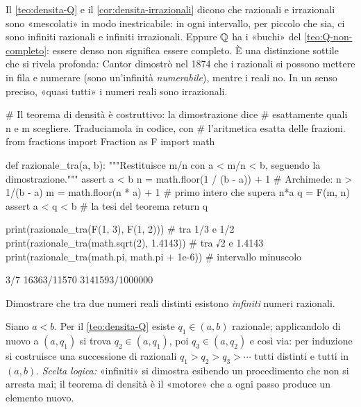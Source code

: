 \begin{osservazione}
Il \cref{teo:densita-Q} e il \cref{cor:densita-irrazionali} dicono che razionali e
irrazionali sono «mescolati» in modo inestricabile: in ogni intervallo, per piccolo che
sia, ci sono infiniti razionali e infiniti irrazionali. Eppure $\mathbb{Q}$ ha i «buchi» del
\cref{teo:Q-non-completo}: essere denso non significa essere completo. È una distinzione
sottile che si rivela profonda: Cantor dimostrò nel 1874 che i razionali si possono
mettere in fila e numerare (sono un'infinità \emph{numerabile}), mentre i reali no. In
un senso preciso, «quasi tutti» i numeri reali sono irrazionali.
\end{osservazione}

\begin{python}
# Il teorema di densità è costruttivo: la dimostrazione dice
# esattamente quali n e m scegliere. Traduciamola in codice, con
# l'aritmetica esatta delle frazioni.
from fractions import Fraction as F
import math

def razionale_tra(a, b):
    """Restituisce m/n con a < m/n < b, seguendo la dimostrazione."""
    assert a < b
    n = math.floor(1 / (b - a)) + 1     # Archimede: n > 1/(b - a)
    m = math.floor(n * a) + 1           # primo intero che supera n*a
    q = F(m, n)
    assert a < q < b                    # la tesi del teorema
    return q

print(razionale_tra(F(1, 3), F(1, 2)))         # tra 1/3 e 1/2
print(razionale_tra(math.sqrt(2), 1.4143))     # tra √2 e 1.4143
print(razionale_tra(math.pi, math.pi + 1e-6))  # intervallo minuscolo
\end{python}
\begin{risultato}
3/7
16363/11570
3141593/1000000
\end{risultato}

\begin{esercizio}
Dimostrare che tra due numeri reali distinti esistono \emph{infiniti} numeri razionali.
\begin{soluzione}
Siano $a<b$. Per il \cref{teo:densita-Q} esiste $q_{1}\in(a,b)$ razionale; applicandolo
di nuovo a $(a,q_{1})$ si trova $q_{2}\in(a,q_{1})$, poi $q_{3}\in(a,q_{2})$ e così via:
per induzione si costruisce una successione di razionali $q_{1}>q_{2}>q_{3}>\cdots$
tutti distinti e tutti in $(a,b)$. \emph{Scelta logica:} «infiniti» si dimostra
esibendo un procedimento che non si arresta mai; il teorema di densità è il «motore»
che a ogni passo produce un elemento nuovo.
\end{soluzione}
\end{esercizio}

